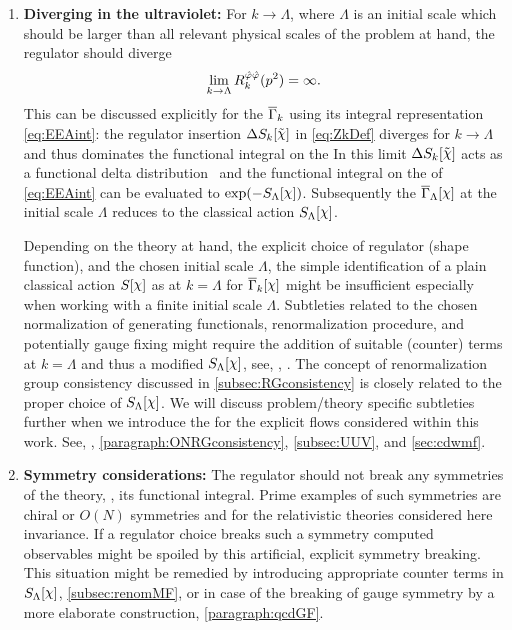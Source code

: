 \begin{enumerate}
	\item {}\label{paragraph:regulatorUV}\textbf{Diverging in the ultraviolet:} For $k\rightarrow \Lambda$, where $\Lambda$ is an \uv{} initial scale which should be larger than all relevant physical scales of the problem at hand, the regulator should diverge
	\begin{align}
	\lim_{k\rightarrow \Lambda} R_k^{\hat{\varphi}\hat{\varphi}}(p^2)=\infty.
	\end{align}
	This can be discussed explicitly for the \eaa{} $\overline{\Gamma}_k$ using its integral representation \eqref{eq:EEAint}: the regulator insertion $\Delta S_k[\FSff{\FSsf}]$ in \eqref{eq:ZkDef} diverges for $k\rightarrow \Lambda$ and thus dominates the functional integral on the \rhs{}
	In this limit $\Delta S_k[\FSff{\FSsf}]$ acts as a functional delta distribution~\cite{Wetterich:2001kra,Gies:2006wv} and the functional integral on the \rhs{} of \cref{eq:EEAint} can be evaluated to $\exp(-\Sinit[\FSmf{\FSsf}])$.
	Subsequently the \rgscaledependent{} \eaa{} $\FSeaa_\Lambda[\FSmf{\FSsf}]$ at the \uv{} initial scale $\Lambda$ reduces to the classical action $\Sinit[\FSmf{\FSsf}]$.
	
	Depending on the theory at hand, the explicit choice of regulator (shape function), and the chosen \uv{} initial scale $\Lambda$, the simple identification of a plain classical action $S[\FSmf{\FSsf}]$ as \ic{} at $k=\Lambda$ for $\FSeaa_k[\FSmf{\FSsf}]$ might be insufficient especially when working with a finite \uv{} initial scale $\Lambda$.
	Subtleties related to the chosen normalization of generating functionals, renormalization procedure, and potentially gauge fixing might require the addition of suitable (counter) terms at $k=\Lambda$ and thus a modified \ic{} $S_\Lambda[\FSmf{\FSsf}]$, see, \eg{}, . 
	The concept of renormalization group consistency discussed in \cref{subsec:RGconsistency} is closely related to the proper choice of $S_\Lambda[\FSmf{\FSsf}]$.
	We will discuss problem/theory specific subtleties further when we introduce the \ics{} for the explicit \frg{} flows considered within this work.
	See, \eg{}, \cref{paragraph:ONRGconsistency}, \cref{subsec:UUV}, and \cref{sec:cdwmf}.
	
	\item {}\label{paragraph:regulatorSym}\textbf{Symmetry considerations:} The regulator should not break any symmetries of the theory, \ie{}, its functional integral.
	Prime examples of such symmetries are chiral or $O(N)$ symmetries and for the relativistic theories considered here \Poincare{} invariance.
	If a regulator choice breaks such a symmetry computed observables might be spoiled by this artificial, explicit symmetry breaking.
	This situation might be remedied by introducing appropriate counter terms in $S_\Lambda[\FSmf{\FSsf}]$, \cf{} \cref{subsec:renomMF}, or in case of the breaking of gauge symmetry by a more elaborate construction, \cf{} \cref{paragraph:qcdGF}.
\end{enumerate}

